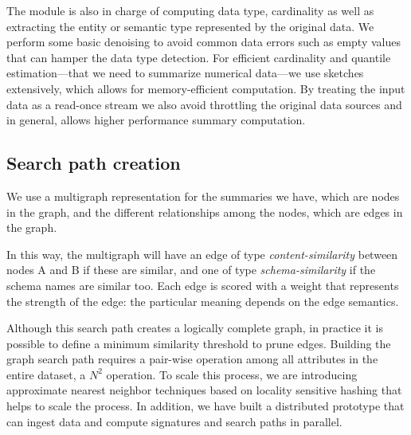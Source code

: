 The module is also in charge of computing data type, cardinality as well as
extracting the entity or semantic type represented by the original data. We
perform some basic denoising to avoid common data errors such as empty values
that can hamper the data type detection. For efficient cardinality and quantile
estimation---that we need to summarize numerical data---we use sketches
extensively, which allows for memory-efficient computation. By treating the
input data as a read-once stream we also avoid throttling the original data
sources and in general, allows higher performance summary computation.


\subsection{Search path creation}
We use a multigraph representation for the summaries we have, which are nodes in the graph, and the different relationships among the nodes, which are edges in the graph. 

In this way, the multigraph will have an edge of type
\emph{content-similarity} between nodes A and B if these are similar, and one of
type \emph{schema-similarity} if the schema names are similar too. Each edge is
scored with a weight that represents the strength of the edge: the particular
meaning depends on the edge semantics.

Although this search path creates a logically complete graph, in practice it is
possible to define a minimum similarity threshold to prune edges. Building the
graph search path requires a pair-wise operation among all attributes in the
entire dataset, a $N^2$ operation. To scale this process, we are introducing
approximate nearest neighbor techniques based on locality sensitive hashing \cite{DBLP:conf/compgeom/DatarIIM04}
that helps to scale the process. In addition, we have built a distributed
prototype that can ingest data and compute signatures and search paths in
parallel.



